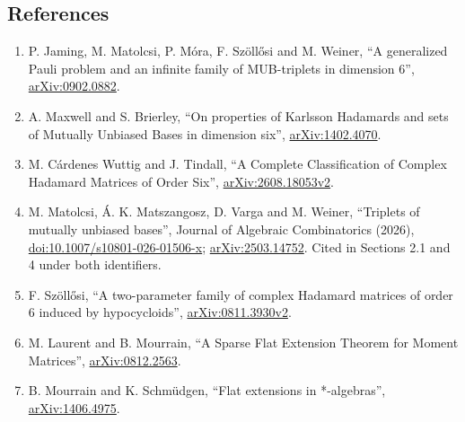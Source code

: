 \documentclass[
]{article}
\providecommand{\tightlist}{%
  \setlength{\itemsep}{0pt}\setlength{\parskip}{0pt}}
\begin{document}
\subsection{References}\label{references}

\begin{enumerate}
\def\labelenumi{\arabic{enumi}.}
\tightlist
\item
  P. Jaming, M. Matolcsi, P. Móra, F. Szöllősi and M. Weiner, ``A
  generalized Pauli problem and an infinite family of MUB-triplets in
  dimension 6'',
  \href{https://arxiv.org/abs/0902.0882v2}{arXiv:0902.0882}.
\item
  A. Maxwell and S. Brierley, ``On properties of Karlsson Hadamards and
  sets of Mutually Unbiased Bases in dimension six'',
  \href{https://arxiv.org/abs/1402.4070v2}{arXiv:1402.4070}.
\item
  M. Cárdenes Wuttig and J. Tindall, ``A Complete Classification of
  Complex Hadamard Matrices of Order Six'',
  \href{https://arxiv.org/abs/2608.18053v2}{arXiv:2608.18053v2}.
\item
  M. Matolcsi, Á. K. Matszangosz, D. Varga and M. Weiner, ``Triplets of
  mutually unbiased bases'', Journal of Algebraic Combinatorics (2026),
  \href{https://doi.org/10.1007/s10801-026-01506-x}{doi:10.1007/s10801-026-01506-x};
  \href{https://arxiv.org/abs/2503.14752}{arXiv:2503.14752}. Cited in
  Sections 2.1 and 4 under both identifiers.
\item
  F. Szöllősi, ``A two-parameter family of complex Hadamard matrices of
  order 6 induced by hypocycloids'',
  \href{https://arxiv.org/abs/0811.3930v2}{arXiv:0811.3930v2}.
\item
  M. Laurent and B. Mourrain, ``A Sparse Flat Extension Theorem for
  Moment Matrices'',
  \href{https://arxiv.org/abs/0812.2563}{arXiv:0812.2563}.
\item
  B. Mourrain and K. Schmüdgen, ``Flat extensions in *-algebras'',
  \href{https://arxiv.org/abs/1406.4975}{arXiv:1406.4975}.
\end{enumerate}
\end{document}
